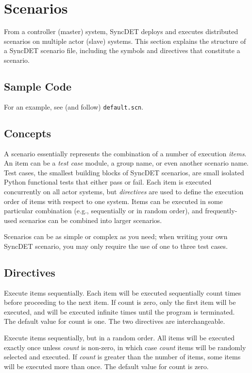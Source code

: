 \section{Scenarios}

From a controller (master) system, SyncDET deploys and executes distributed
scenarios on multiple actor (slave) systems. This section explains the structure
of a SyncDET scenario file, including the symbols and directives that constitute
a scenario.

\subsection{Sample Code}
For an example, see (and follow) {\tt default.scn}.

\subsection{Concepts}
A scenario essentially represents the combination of a number of execution {\em
items}. An item can be a {\em test case} module, a group name, or even another
scenario name. Test cases, the smallest building blocks of SyncDET scenarios,
are small isolated Python functional tests that either pass or fail. Each item
is executed concurrently on all actor systems, but {\em directives} are used to
define the execution order of items with respect to one system.  Items can be
executed in some particular combination (e.g., sequentially or in random order),
and frequently-used scenarios can be combined into larger scenarios.

Scenarios can be as simple or complex as you need; when writing your own SyncDET
scenario, you may only require the use of one to three test cases.

\subsection{Directives}

Execute items sequentially. Each item will be executed sequentially count times
before proceeding to the next item. If count is zero, only the first item will
be executed, and will be executed infinite times until the program is
terminated. The default value for count is one. The two directives are
interchangeable.

Execute items sequentially, but in a random order. All items will be executed
exactly once unless {\it count} is non-zero, in which case {\it count} items
will be randomly selected and executed. If {\it count} is greater than the
number of items, some items will be executed more than once. The default value
for count is zero.

